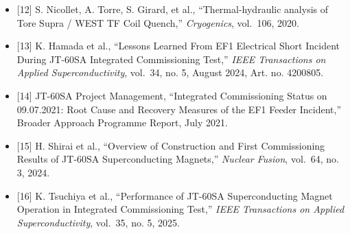 \documentclass[11pt,a4paper]{article}
\begin{document}
\begin{itemize}
\item
  {[}12{]} S. Nicollet, A. Torre, S. Girard, et al., ``Thermal-hydraulic analysis of Tore Supra / WEST TF Coil Quench,'' \emph{Cryogenics}, vol.~106, 2020.
\item
  {[}13{]} K. Hamada et al., ``Lessons Learned From EF1 Electrical Short Incident During JT-60SA Integrated Commissioning Test,'' \emph{IEEE Transactions on Applied Superconductivity}, vol.~34, no. 5, August 2024, Art. no. 4200805.
\item
  {[}14{]} JT-60SA Project Management, ``Integrated Commissioning Status on 09.07.2021: Root Cause and Recovery Measures of the EF1 Feeder Incident,'' Broader Approach Programme Report, July 2021.
\item
  {[}15{]} H. Shirai et al., ``Overview of Construction and First Commissioning Results of JT-60SA Superconducting Magnets,'' \emph{Nuclear Fusion}, vol.~64, no. 3, 2024.
\item
  {[}16{]} K. Tsuchiya et al., ``Performance of JT-60SA Superconducting Magnet Operation in Integrated Commissioning Test,'' \emph{IEEE Transactions on Applied Superconductivity}, vol.~35, no. 5, 2025.
\end{itemize}
\end{document}
